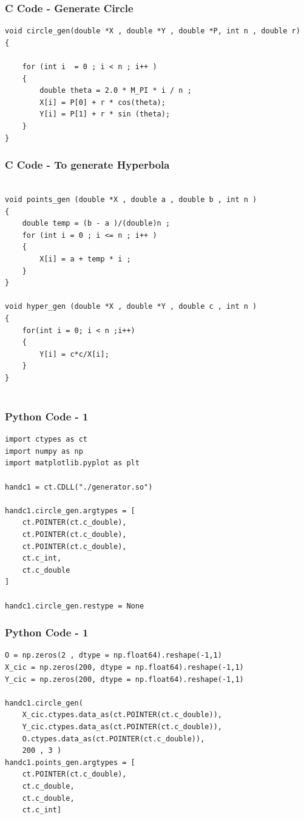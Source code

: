 \documentclass{beamer}
\begin{document}
\begin{frame}[fragile]
    \frametitle{C Code - Generate Circle }
    \begin{lstlisting}
void circle_gen(double *X , double *Y , double *P, int n , double r)
{
 
    for (int i  = 0 ; i < n ; i++ )
    {
        double theta = 2.0 * M_PI * i / n ; 
        X[i] = P[0] + r * cos(theta);
        Y[i] = P[1] + r * sin (theta); 
    }   
}

\end{lstlisting}
\end{frame}
\begin{frame}[fragile]
    \frametitle{C Code - To generate Hyperbola }
    \begin{lstlisting}
	
void points_gen (double *X , double a , double b , int n )
{
    double temp = (b - a )/(double)n ; 
    for (int i = 0 ; i <= n ; i++ )
    {
        X[i] = a + temp * i ; 
    }
}

void hyper_gen (double *X , double *Y , double c , int n )
{
    for(int i = 0; i < n ;i++)
    {
        Y[i] = c*c/X[i];
    }
}


\end{lstlisting}
\end{frame}


\begin{frame}[fragile]
    \frametitle{Python Code - 1}
    \begin{lstlisting}
import ctypes as ct
import numpy as np
import matplotlib.pyplot as plt

handc1 = ct.CDLL("./generator.so")

handc1.circle_gen.argtypes = [
    ct.POINTER(ct.c_double),
    ct.POINTER(ct.c_double),
    ct.POINTER(ct.c_double),
    ct.c_int,
    ct.c_double
]

handc1.circle_gen.restype = None

\end{lstlisting}
\end{frame}

\begin{frame}[fragile]
    \frametitle{Python Code - 1}
    \begin{lstlisting}
O = np.zeros(2 , dtype = np.float64).reshape(-1,1)
X_cic = np.zeros(200, dtype = np.float64).reshape(-1,1)
Y_cic = np.zeros(200, dtype = np.float64).reshape(-1,1)

handc1.circle_gen(
    X_cic.ctypes.data_as(ct.POINTER(ct.c_double)),
    Y_cic.ctypes.data_as(ct.POINTER(ct.c_double)),
    O.ctypes.data_as(ct.POINTER(ct.c_double)),
    200 , 3 )
handc1.points_gen.argtypes = [
    ct.POINTER(ct.c_double),
    ct.c_double,
    ct.c_double,
    ct.c_int]
\end{lstlisting}
\end{frame}
\end{document}
